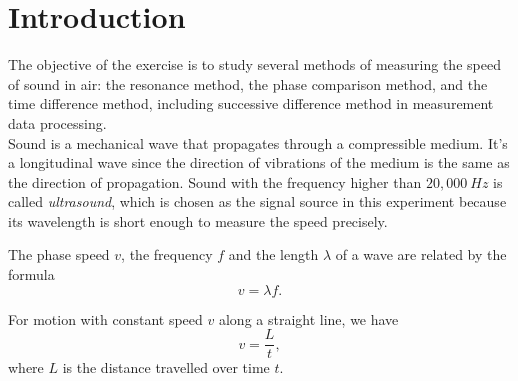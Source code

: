 \section{Introduction}
    The objective of the exercise is to study several methods of measuring the speed of sound in air: the resonance method, the phase comparison method, and the time difference method, including successive difference method in measurement data processing.\\
    
    Sound is a mechanical wave that propagates through a compressible medium. It's a longitudinal wave since the direction of vibrations of the medium is the same as the direction of propagation. Sound with the frequency higher than $20,000\ Hz$ is called \emph{ultrasound}, which is chosen as the signal source in this experiment because its wavelength is short enough to measure the speed precisely.
    
    The phase speed $v$, the frequency $f$ and the length $\lambda$ of a wave are related by the formula
    \begin{equation}\label{vlf}
        v=\lambda f.
    \end{equation}

    For motion with constant speed $v$ along a straight line, we have
    \begin{equation}\label{vlt}
        v=\frac{L}{t},
    \end{equation}
    where $L$ is the distance travelled over time $t$.


